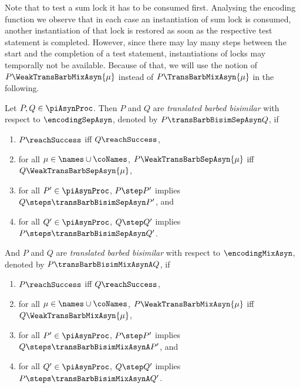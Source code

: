 \documentclass[]{llncs}
\begin{document}
Note that to test a sum lock it has to be consumed first. Analysing the encoding function we observe that in each case an instantiation of sum lock is consumed, another instantiation of that lock is restored as soon as the respective test statement is completed. However, since there may lay many steps between the start and the completion of a test statement, instantiations of locks may temporally not be available. Because of that, we will use the notion of $ P\WeakTransBarbMixAsyn{\mu} $ instead of $ P\TransBarbMixAsyn{\mu} $ in the following.

\begin{definition} \label{def:transBarbBisim}
	Let $ P, Q \in \piAsynProc $. Then $ P $ and $ Q $ are \emph{translated barbed bisimilar} with respect to $ \encodingSepAsyn $, denoted by $ P \transBarbBisimSepAsyn Q $, if
	\begin{enumerate}
		\item $ P\reachSuccess $ iff $ Q\reachSuccess $,
		\item for all $ \mu \in \names \cup \coNames $, $ P\WeakTransBarbSepAsyn{\mu} $ iff $ Q\WeakTransBarbSepAsyn{\mu} $,
		\item for all $ P' \in \piAsynProc $, $ P \step P' $ implies $ Q \steps \transBarbBisimSepAsyn P' $, and
		\item for all $ Q' \in \piAsynProc $, $ Q \step Q' $ implies $ P \steps \transBarbBisimSepAsyn Q' $.
	\end{enumerate}
	And $ P $ and $ Q $ are \emph{translated barbed bisimilar} with respect to $ \encodingMixAsyn $, denoted by $ P \transBarbBisimMixAsynA Q $, if
	\begin{enumerate}
		\item $ P\reachSuccess $ iff $ Q\reachSuccess $,
		\item for all $ \mu \in \names \cup \coNames $, $ P\WeakTransBarbMixAsyn{\mu} $ iff $ Q\WeakTransBarbMixAsyn{\mu} $,
		\item for all $ P' \in \piAsynProc $, $ P \step P' $ implies $ Q \steps \transBarbBisimMixAsynA P' $, and
		\item for all $ Q' \in \piAsynProc $, $ Q \step Q' $ implies $ P \steps \transBarbBisimMixAsynA Q' $.
	\end{enumerate}
\end{definition}
\end{document}
